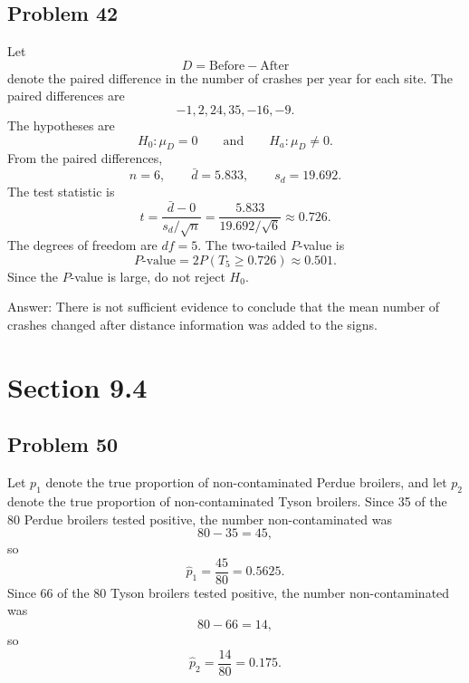 \documentclass[11pt]{article}
\begin{document}
\subsection*{Problem 42}

Let
\[
D=\text{Before}-\text{After}
\]
denote the paired difference in the number of crashes per year for each site. The paired differences are
\[
-1,
2,
24,
35,
-16,
-9.
\]
The hypotheses are
\[
H_0:\mu_D=0
\qquad \text{and} \qquad
H_a:\mu_D\neq 0.
\]
From the paired differences,
\[
n=6,
\qquad \bar{d}=5.833,
\qquad s_d=19.692.
\]
The test statistic is
\[
t=\frac{\bar{d}-0}{s_d/\sqrt{n}}
=\frac{5.833}{19.692/\sqrt{6}}
\approx 0.726.
\]
The degrees of freedom are $df=5$. The two-tailed $P$-value is
\[
P\text{-value}=2P(T_5\ge 0.726)\approx 0.501.
\]
Since the $P$-value is large, do not reject $H_0$.

Answer: There is not sufficient evidence to conclude that the mean number of crashes changed after distance information was added to the signs.

\section*{Section 9.4}

\subsection*{Problem 50}

Let $p_1$ denote the true proportion of non-contaminated Perdue broilers, and let $p_2$ denote the true proportion of non-contaminated Tyson broilers. Since 35 of the 80 Perdue broilers tested positive, the number non-contaminated was
\[
80-35=45,
\]
so
\[
\hat{p}_1=\frac{45}{80}=0.5625.
\]
Since 66 of the 80 Tyson broilers tested positive, the number non-contaminated was
\[
80-66=14,
\]
so
\[
\hat{p}_2=\frac{14}{80}=0.175.
\]
\end{document}
